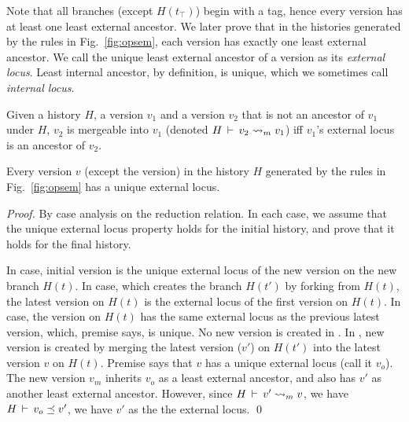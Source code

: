 Note that all branches (except $H(t_{\top})$) begin with a 
tag, hence every version has at least one least external ancestor. We
later prove that in the histories generated by the rules in
Fig.~\ref{fig:opsem}, each version has exactly one least external
ancestor. We call the unique least external ancestor of a version as
its \emph{external locus}. Least internal ancestor, by definition, is
unique, which we sometimes call \emph{internal locus}.

\begin{definition} 
Given a history $H$, a version $v_1$ and a version $v_2$ that is not
an ancestor of $v_1$ under $H$, $v_2$ is mergeable into $v_1$ (denoted
$H\,\vdash\,v_2 \rightsquigarrow_m v_1$) iff $v_1$'s external locus is an
ancestor of $v_2$.
\end{definition}

\begin{lemma} 
Every version $v$ (except the  version) in the history $H$
generated by the rules in Fig.~\ref{fig:opsem} has a unique external
locus.
\end{lemma}
\begin{proof}
By case analysis on the reduction relation. In each case, we assume
that the unique external locus property holds for the initial history,
and prove that it holds for the final history.

In  case, initial version is the unique external locus of
the new version on the new branch $H(t)$. In  case,
which creates the branch $H(t')$ by forking from $H(t)$, the latest
version on $H(t)$ is the external locus of the first version on
$H(t)$. In  case, the version on $H(t)$ has the same
external locus as the previous latest version, which, premise says, is
unique. No new version is created in . In
, new version is created by merging the latest
version ($v'$) on $H(t')$ into the latest version $v$ on $H(t)$.
Premise says that $v$ has a unique external locus (call it $v_o$). The
new version $v_m$ inherits $v_o$ as a least external ancestor, and
also has $v'$ as another least external ancestor. However, since
$H\,\vdash\,v' \rightsquigarrow_m v$, we have $H\,\vdash\,v_o \preceq v'$, we
have $v'$ as the the external locus.
\qed
\end{proof}


